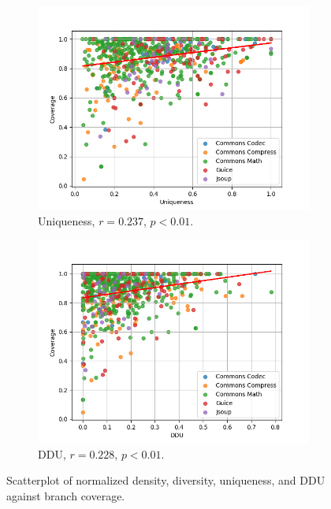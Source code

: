 \documentclass[twoside,a4paper,11pt]{memoir}
\begin{document}
\begin{figure}
    \begin{subfigure}[b]{0.49\linewidth}
        \centering
        \includegraphics[width=\linewidth]{figures/coverage_uniqueness}
        \caption{Uniqueness, $r=0.237$, $p<0.01$.}
        \label{fig:coverage_uniqueness}
    \end{subfigure}
    \hfill
    \begin{subfigure}[b]{0.49\linewidth}
        \centering
        \includegraphics[width=\linewidth]{figures/coverage_ddu}
        \caption{DDU, $r=0.228$, $p<0.01$.}
        \label{fig:coverage_ddu}
    \end{subfigure}
    \caption{Scatterplot of normalized density, diversity, uniqueness, and DDU against branch coverage.}
    \label{fig:coverage_metric}
\end{figure}
\end{document}
